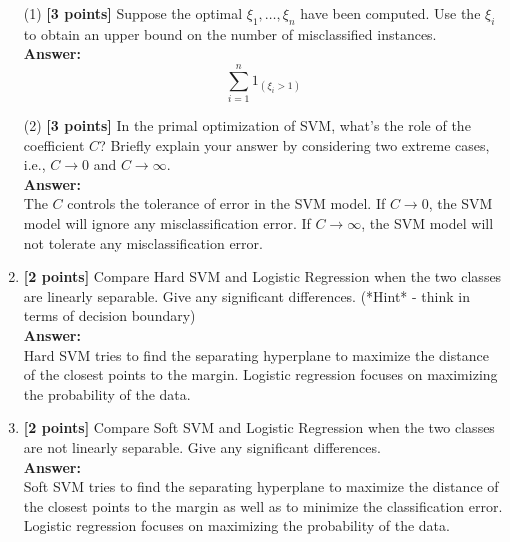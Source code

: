 \documentclass{article}
\begin{document}
\begin{enumerate}
	(1) \textbf{[3 points]} Suppose the optimal $\xi_1,\ldots,\xi_n$ have been computed. Use the $\xi_i$ to obtain an upper bound on the number of misclassified instances.\\
	\textbf{Answer:}\\
	$$\sum_{i=1}^n 1_{(\xi_i>1)}$$




	(2) \textbf{[3 points]} In the primal optimization of SVM, what's the role of the coefficient $C$?
	Briefly explain your answer by considering two extreme cases, i.e., $C\rightarrow 0$ and $C\rightarrow\infty$.\\
	\textbf{Answer:}\\
	The $C$ controls the tolerance of error in the SVM model. If $C \rightarrow 0$, the SVM model will ignore any misclassification error. If $C \rightarrow \infty$, the SVM model will not tolerate any misclassification error.



	\item\textbf{[2 points]} Compare Hard SVM and Logistic Regression when the two classes are linearly separable. Give any significant differences. (*Hint* - think in terms of decision boundary)\\
	\textbf{Answer:}\\
	Hard SVM tries to find the separating hyperplane to maximize the distance of the closest points to the margin. Logistic regression focuses on maximizing the probability of the data.



	\item\textbf{[2 points]} Compare Soft SVM and Logistic Regression when the two classes are not linearly separable. Give any significant differences.\\
	\textbf{Answer:}\\
	Soft SVM tries to find the separating hyperplane to maximize the distance of the closest points to the margin as well as to minimize the classification error. Logistic regression focuses on maximizing the probability of the data.




\end{enumerate}
\end{document}
